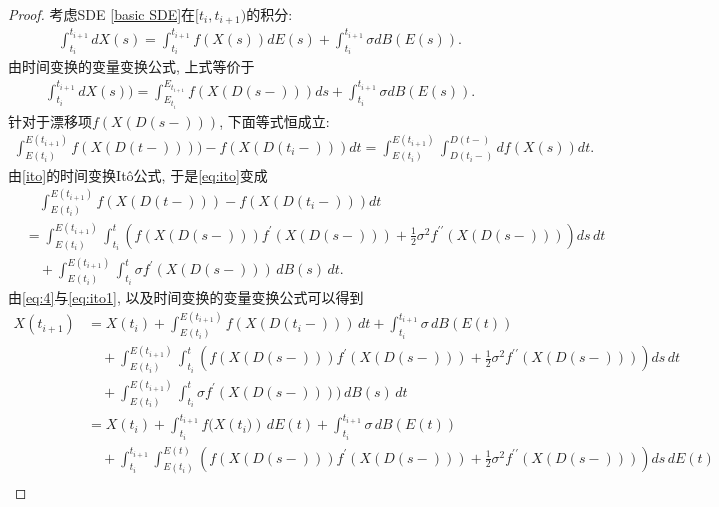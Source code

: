 \begin{proof}
	
	考虑SDE \eqref{basic SDE}在$[t_i, t_{i+1})$的积分:
	\begin{align}
		\int_{t_i}^{t_{i+1}}dX(s)=\int_{t_i}^{t_{i+1}}f(X(s))dE(s)+\int_{t_i}^{t_{i+1}}\sigma dB(E(s)). 
	\end{align}
	由时间变换的变量变换公式\cite{kobayashi2011stochastic}, 上式等价于
	\begin{align}\label{eq:4}
		\int_{t_i}^{t_{i+1}}dX(s))=\int_{E_{t_i}}^{E_{t_{i+1}}}f(X(D(s-)))ds+\int_{t_i}^{t_{i+1}}\sigma dB(E(s)). 
	\end{align}
	针对于漂移项$f(X(D(s-)))$, 下面等式恒成立:
	\begin{align}\label{eq:ito}
		\int_{E(t_i)}^{E(t_{i+1})} f(X(D(t-)))) - f(X(D(t_i-))) dt = \int_{E(t_i)}^{E(t_{i+1})} \int^{D(t-)}_{D(t_i-)} df(X(s)) dt. 
	\end{align}
	由\cref{ito}的时间变换It\^{o}公式, 于是\eqref{eq:ito}变成
	\begin{equation}\label{eq:ito1}
		\begin{aligned}
			&\quad\int_{E(t_i)}^{E(t_{i+1})} f(X(D(t-))) - f(X(D(t_i-))) dt \\
			&= \int_{E(t_i)}^{E(t_{i+1})} \int_{t_i}^{t} \left( f(X(D(s-))) f^{\prime}(X(D(s-))) + \frac{1}{2} \sigma^2 f^{\prime\prime}(X(D(s-))) \right) ds \, dt\\
			&\quad + \int_{E(t_i)}^{E(t_{i+1})} \int_{t_i}^{t} \sigma f^{\prime}(X(D(s-))) \, dB(s) \, dt . 
		\end{aligned}
	\end{equation}
	由\eqref{eq:4}与\eqref{eq:ito1}, 以及时间变换的变量变换公式可以得到
	\begin{align*}
		X(t_{i+1}) 
		&= X(t_i) + \int_{E(t_i)}^{E(t_{i+1})} f(X({D(t_i-)})) \, dt + \int_{t_i}^{t_{i+1}} \sigma \, dB(E(t)) \\
		&\quad + \int_{E(t_i)}^{E(t_{i+1})} \int_{t_i}^{t}\left( f(X(D(s-))) f^{\prime}(X(D(s-))) + \frac{1}{2} \sigma^2 f^{\prime\prime}(X(D(s-))) \right) ds \, dt \\
		&\quad + \int_{E(t_i)}^{E(t_{i+1})} \int_{t_i}^{t}\sigma f^{\prime}(X(D(s-)))) \, dB(s) \, dt \\
		&= X(t_i) + \int_{t_i}^{t_{i+1}} f(X({t_i)}) \, dE(t) + \int_{t_i}^{t_{i+1}} \sigma \, dB(E(t)) \\
		&\quad + \int_{t_i}^{t_{i+1}} \int_{E(t_i)}^{E(t)} \left( f(X(D(s-))) f^{\prime}(X(D(s-))) + \frac{1}{2} \sigma^2 f^{\prime\prime}(X(D(s-))) \right) ds \, dE(t) \\

\end{align*}
\end{proof}
